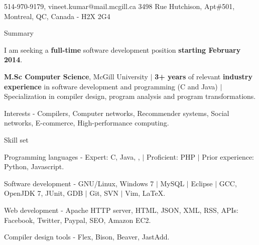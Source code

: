 \documentclass{resume} %
\begin{document}
\begin{hSubsection}{514-970-9179, vineet.kumar@mail.mcgill.ca}
{%
}{3498 Rue Hutchison, Apt\#501, Montreal, QC, Canada - H2X 2G4}
\end{hSubsection}



\begin{rSection}{Summary}
\smallskip
\begin{lSubsection}
\item I am seeking a \textbf{full-time} software development position
	\textbf{starting February 2014}.
\item \textbf{M.Sc Computer Science}, McGill University $\vert$
	\textbf{3+ years} of relevant \textbf{industry experience} in software
	 development and programming (C and Java) $\vert$ Specialization in
	 compiler design, program analysis and program transformations.
  \item Interests - Compilers, Computer networks, Recommender systems, Social networks, E-commerce, High-performance computing. 
 \item Skill set
 \begin{lsubSubsection}
 	\item Programming languages - Expert: C, Java, \xten, \matlab $\vert$ Proficient: PHP $\vert$ Prior experience: Python, Javascript.
 	\item Software development - GNU/Linux, Windows 7 $\vert$ MySQL $\vert$ Eclipse $\vert$ GCC, OpenJDK 7, JUnit, GDB 
		$\vert$ Git, SVN $\vert$ Vim, \LaTeX. 
 	\item Web development - Apache HTTP server, HTML, JSON, XML, RSS, APIs: Facebook, Twitter, Paypal, SEO, Amazon EC2.
 	\item Compiler design tools - Flex, Bison, Beaver, JastAdd.
 \end{lsubSubsection}
\end{lSubsection}
\end{rSection}
\end{document}

